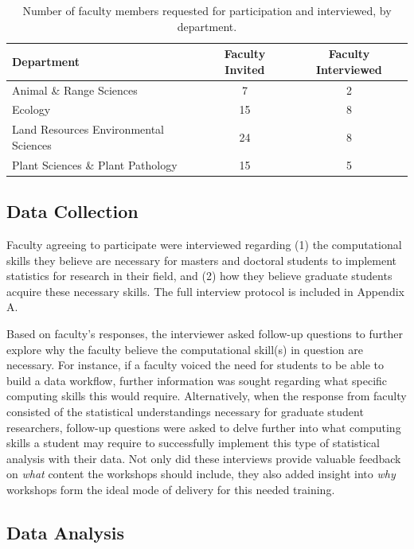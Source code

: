 \documentclass[12pt]{article}
\begin{document}
{
\begin{table}[h!]
\centering
\begin{tabular}{lcc}
\hline
Department & Faculty Invited & Faculty Interviewed  \\
\hline
Animal \& Range Sciences & 7 & 2 \\
Ecology & 15 & 8 \\
Land Resources Environmental Sciences & 24 & 8 \\
Plant Sciences \& Plant Pathology &  15 & 5 \\ 
\hline
\end{tabular}
\caption{Number of faculty members requested for participation and interviewed,
by department.}
\label{tab:faculty}
\end{table}
}

\subsection{Data Collection}  

\quad Faculty agreeing to participate were interviewed regarding (1) the 
computational skills they believe are necessary for masters and doctoral 
students to implement statistics for research in their field, and (2) how they 
believe graduate students acquire these necessary skills. The full interview 
protocol is included in Appendix A.  

\quad Based on faculty's responses, the interviewer asked follow-up questions to
further explore why the faculty believe the computational skill(s) in question 
are necessary. For instance, if a faculty voiced the need for students to be 
able to build a data workflow, further information was sought regarding what 
specific computing skills this would require. Alternatively, when the response 
from faculty consisted of the statistical understandings necessary for graduate
student researchers, follow-up questions were asked to delve further into what
computing skills a student may require to successfully implement this type of
statistical analysis with their data. Not only did these interviews provide
valuable feedback on \emph{what} content the workshops should include, they also
added insight into \emph{why} workshops form the ideal mode of delivery for this
needed training.  

\subsection{Data Analysis} 
\end{document}
